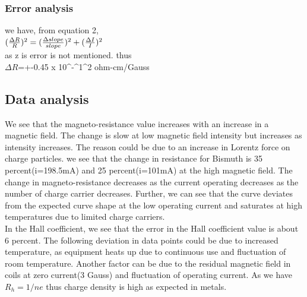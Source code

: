 \subsubsection{Error analysis}
we have, from equation 2, \\
\(($$\frac{\Delta R}{R}$$)^2=($$\frac{\Delta slope}{slope}$$)^2 + ($$\frac{\Delta I }{I}$$)^2\)\\
as z is error is not mentioned.
thus\\
\(\Delta R\)=+-0.45 x 10^-^1^2 ohm-cm/Gauss
\subsection{Data analysis}
We see that the magneto-resistance value increases with an increase in a magnetic field. The change is slow at low magnetic field intensity but increases as intensity increases. The reason could be due to an increase in Lorentz force on charge particles. we see that the change in resistance for Bismuth is 35 percent(i=198.5mA) and 25 percent(i=101mA) at the high magnetic field. The change in magneto-resistance decreases as the current operating decreases as the number of charge carrier decreases. Further, we can see that the curve deviates from the expected curve shape at the low operating current and  saturates at high temperatures due to limited charge carriers.\\
In the Hall coefficient, we see that the error in the Hall coefficient value is about 6 percent. The following deviation in data points could be due to increased temperature, as equipment heats up due to continuous use and fluctuation of room temperature. Another factor can be due to the residual magnetic field in coils at zero current(3 Gauss) and fluctuation of operating current. As we have \(R_h=1/ne \) thus charge density is high as expected in metals.